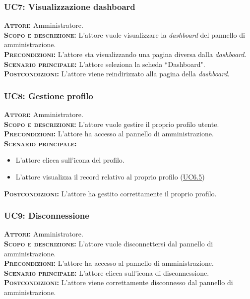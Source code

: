 \subsubsection{UC7: Visualizzazione dashboard}
\label{sec:UC7}
\textsc{\textbf{Attori:}} Amministratore.\\
\textsc{\textbf{Scopo e descrizione:}} L'attore vuole visualizzare la \textit{dashboard} del pannello di amministrazione.\\
\textsc{\textsc{\textbf{Precondizioni:}}} L'attore sta visualizzando una pagina diversa dalla \textit{dashboard}.\\
\textsc{\textbf{Scenario principale:}} L'attore seleziona la scheda ``Dashboard".\\
\textsc{\textbf{Postcondizioni:}} L'attore viene reindirizzato alla pagina della \textit{dashboard}.

\subsubsection{UC8: Gestione profilo}
\label{sec:UC8}
\textsc{\textbf{Attori:}} Amministratore.\\
\textsc{\textbf{Scopo e descrizione:}} L'attore vuole gestire il proprio profilo utente.\\
\textsc{\textsc{\textbf{Precondizioni:}}} L'attore ha accesso al pannello di amministrazione.\\
\textsc{\textbf{Scenario principale:}}
\begin{itemize}
    \item L'attore clicca sull'icona del profilo.
    \item L'attore visualizza il record relativo al proprio profilo (\hyperref[sec:UC65]{UC6.5})
\end{itemize}
\textsc{\textbf{Postcondizioni:}} L'attore ha gestito correttamente il proprio profilo.

\subsubsection{UC9: Disconnessione}
\label{sec:UC9}
\textsc{\textbf{Attori:}} Amministratore.\\
\textsc{\textbf{Scopo e descrizione:}} L'attore vuole disconnettersi dal pannello di amministrazione.\\
\textsc{\textsc{\textbf{Precondizioni:}}} L'attore ha accesso al pannello di amministrazione.\\
\textsc{\textbf{Scenario principale:}} L'attore clicca sull'icona di disconnessione.\\
\textsc{\textbf{Postcondizioni:}} L'attore viene correttamente disconnesso dal pannello di amministrazione.

